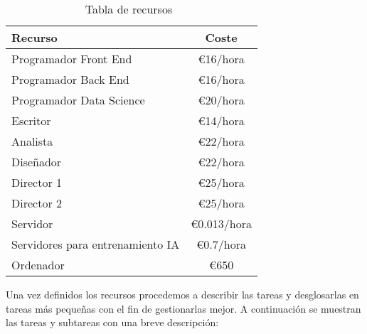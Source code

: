 \begin{table}[htbp!]
    \centering
    \begin{tabular}{l c}
        \toprule
        \textbf{Recurso}                 & \textbf{Coste}    \\
        \midrule \midrule
        Programador Front End            & \euro{16}/hora    \\ 
        Programador Back End             & \euro{16}/hora    \\ 
        Programador Data Science         & \euro{20}/hora    \\ 
        Escritor                         & \euro{14}/hora    \\ 
        Analista                         & \euro{22}/hora    \\ 
        Diseñador                        & \euro{22}/hora    \\ 
        Director 1                       & \euro{25}/hora    \\ 
        Director 2                       & \euro{25}/hora    \\ 
        Servidor                         & \euro{0.013}/hora \\ 
        Servidores para entrenamiento IA & \euro{0.7}/hora   \\ 
        Ordenador                        & \euro{650}        \\
        \bottomrule
    \end{tabular}
    \caption{Tabla de recursos~\cite{ministerio}}
    \label{tab:resources}
\end{table}


Una vez definidos los recursos procedemos a describir las tareas y desglosarlas en tareas más pequeñas con el fin de gestionarlas mejor. A continuación se muestran las tareas y subtareas con una breve descripción:

